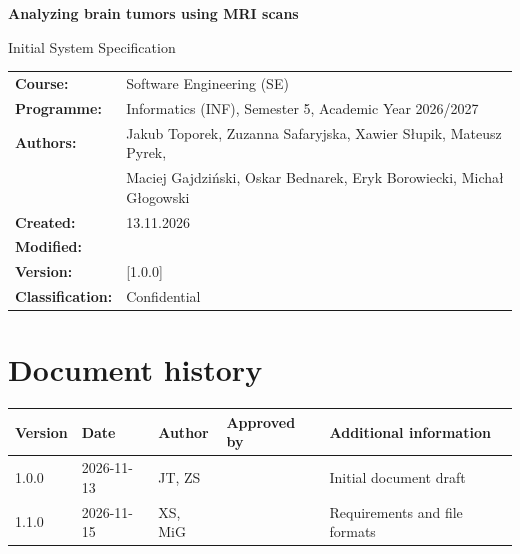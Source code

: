 \documentclass[11pt, a4paper]{article}
\begin{document}
\begin{titlepage}
    \centering
    \vspace*{2cm}

    {\LARGE \bfseries Analyzing brain tumors using MRI scans \par}
    \vspace{0.5cm}
    {\Large Initial System Specification \par}

    \vspace{2cm}

    \begin{tabularx}{\textwidth}{@{} >{\bfseries}l X @{}}
        Course:         & Software Engineering (SE)                                            \\
        Programme:      & Informatics (INF), Semester 5, Academic Year 2026/2027               \\
        Authors:        & Jakub Toporek, Zuzanna Safaryjska, Xawier Słupik, Mateusz Pyrek,     \\
                        & Maciej Gajdziński, Oskar Bednarek, Eryk Borowiecki, Michał Głogowski \\
        Created:        & 13.11.2026                                                           \\
        Modified:       &                                                                      \\
        Version:        & {[1.0.0]}                                                            \\
        Classification: & Confidential                                                         \\
    \end{tabularx}

    \vfill
\end{titlepage}

\tableofcontents
\newpage

\section{Document history}

\noindent
\renewcommand{\arraystretch}{1.3}
\begin{tabularx}{\textwidth}{|l|l|l|l|X|}
    \hline
    \textbf{Version} & \textbf{Date} & \textbf{Author} & \textbf{Approved by} & \textbf{Additional information} \\
    \hline
    1.0.0            & 2026-11-13    & JT, ZS          &                      & Initial document draft          \\ \hline
    1.1.0            & 2026-11-15    & XS, MiG         &                      & Requirements and file formats   \\
    \hline
\end{tabularx}
\end{document}

